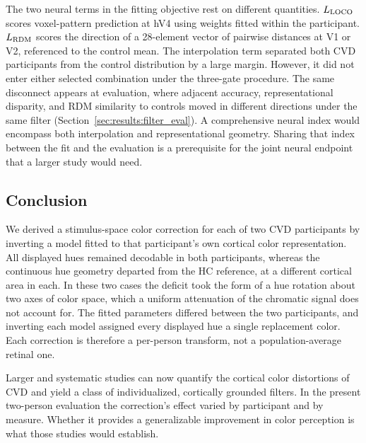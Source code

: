 The two neural terms in the fitting objective rest on different quantities. $L_{\rm LOCO}$ scores voxel-pattern prediction at hV4 using weights fitted within the participant. $L_{\rm RDM}$ scores the direction of a 28-element vector of pairwise distances at V1 or V2, referenced to the control mean. The interpolation term separated both CVD participants from the control distribution by a large margin. However, it did not enter either selected combination under the three-gate procedure. The same disconnect appears at evaluation, where adjacent accuracy, representational disparity, and RDM similarity to controls moved in different directions under the same filter (Section~\ref{sec:results:filter_eval}). A comprehensive neural index would encompass both interpolation and representational geometry. Sharing that index between the fit and the evaluation is a prerequisite for the joint neural endpoint that a larger study would need.

\subsection{Conclusion}
We derived a stimulus-space color correction for each of two CVD participants by inverting a model fitted to that participant's own cortical color representation. All displayed hues remained decodable in both participants, whereas the continuous hue geometry departed from the HC reference, at a different cortical area in each. In these two cases the deficit took the form of a hue rotation about two axes of color space, which a uniform attenuation of the chromatic signal does not account for. The fitted parameters differed between the two participants, and inverting each model assigned every displayed hue a single replacement color. Each correction is therefore a per-person transform, not a population-average retinal one.

Larger and systematic studies can now quantify the cortical color distortions of CVD and yield a class of individualized, cortically grounded filters. In the present two-person evaluation the correction's effect varied by participant and by measure. Whether it provides a generalizable improvement in color perception is what those studies would establish.
